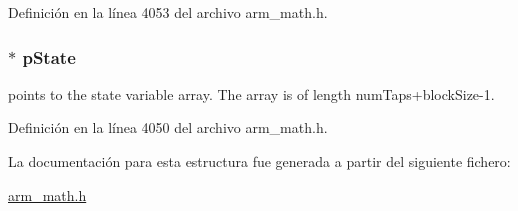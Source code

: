Definición en la línea 4053 del archivo arm\+\_\+math.\+h.

\subsubsection[{\texorpdfstring{p\+State}{pState}}]{$\ast$ p\+State}\hypertarget{structarm__lms__instance__q15_ae29dfdb736374fcddaeaec4b7770170c}{}\label{structarm__lms__instance__q15_ae29dfdb736374fcddaeaec4b7770170c}
points to the state variable array. The array is of length num\+Taps+block\+Size-\/1. 

Definición en la línea 4050 del archivo arm\+\_\+math.\+h.



La documentación para esta estructura fue generada a partir del siguiente fichero\+:\begin{DoxyCompactItemize}
\item 
\hyperlink{arm__math_8h}{arm\+\_\+math.\+h}\end{DoxyCompactItemize}
